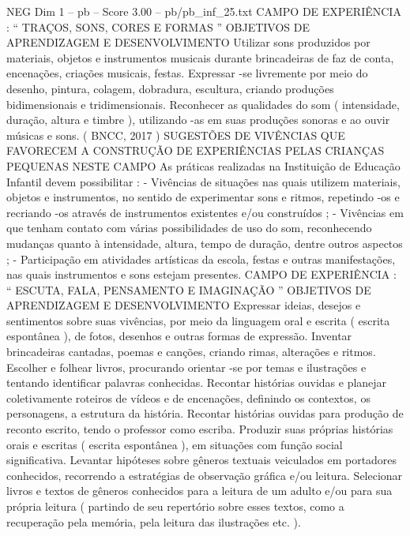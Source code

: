 \begin{textsample}{NEG Dim 1 – pb – Score 3.00 – pb/pb\_inf\_25.txt}  \label{ex:f1_neg_148}
CAMPO DE EXPERIÊNCIA : “ TRAÇOS, SONS, CORES E FORMAS ” OBJETIVOS DE APRENDIZAGEM E DESENVOLVIMENTO Utilizar sons produzidos por materiais, objetos e instrumentos musicais durante brincadeiras de faz de conta, encenações, criações musicais, festas.
Expressar -se livremente por meio do desenho, pintura, colagem, dobradura, escultura, criando produções bidimensionais e tridimensionais.
Reconhecer as qualidades do som ( intensidade, duração, altura e timbre ), utilizando -as em suas produções sonoras e ao ouvir músicas e sons. ( BNCC, 2017 ) SUGESTÕES DE VIVÊNCIAS QUE FAVORECEM A CONSTRUÇÃO DE EXPERIÊNCIAS PELAS CRIANÇAS PEQUENAS NESTE CAMPO As práticas realizadas na Instituição de Educação Infantil devem possibilitar : - Vivências de situações nas quais utilizem materiais, objetos e instrumentos, no sentido de experimentar sons e ritmos, repetindo -os e recriando -os através de instrumentos existentes e/ou construídos ; - Vivências em que tenham contato com várias possibilidades de uso do som, reconhecendo mudanças quanto à intensidade, altura, tempo de duração, dentre outros aspectos ; - Participação em atividades artísticas da escola, festas e outras manifestações, nas quais instrumentos e sons estejam presentes.
CAMPO DE EXPERIÊNCIA : “ ESCUTA, FALA, PENSAMENTO E IMAGINAÇÃO ” OBJETIVOS DE APRENDIZAGEM E DESENVOLVIMENTO Expressar ideias, desejos e sentimentos sobre suas vivências, por meio da linguagem oral e escrita ( escrita espontânea ), de fotos, desenhos e outras formas de expressão.
Inventar brincadeiras cantadas, poemas e canções, criando rimas, alterações e ritmos.
Escolher e folhear livros, procurando orientar -se por temas e ilustrações e tentando identificar palavras conhecidas.
Recontar histórias ouvidas e planejar coletivamente roteiros de vídeos e de encenações, definindo os contextos, os personagens, a estrutura da história.
Recontar histórias ouvidas para produção de reconto escrito, tendo o professor como escriba.
Produzir suas próprias histórias orais e escritas ( escrita espontânea ), em situações com função social significativa.
Levantar hipóteses sobre gêneros textuais veiculados em portadores conhecidos, recorrendo a estratégias de observação gráfica e/ou leitura.
Selecionar livros e textos de gêneros conhecidos para a leitura de um adulto e/ou para sua própria leitura ( partindo de seu repertório sobre esses textos, como a recuperação pela memória, pela leitura das ilustrações etc. ).

\end{textsample}
